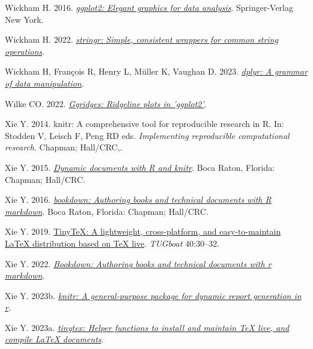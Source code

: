 \documentclass[10pt,a4paper]{article}
\newlength{\cslhangindent}
\newlength{\cslentryspacingunit} %
\newenvironment{CSLReferences}[2] %
 {%
  \setlength{\parindent}{0pt}
  \ifodd #1
  \let\oldpar\par
  \def\par{\hangindent=\cslhangindent\oldpar}
  \fi
  \setlength{\parskip}{#2\cslentryspacingunit}
 }%
 {}
\begin{document}
\begin{CSLReferences}{1}{0}
\leavevmode{}%
Wickham H. 2016. \emph{\href{https://ggplot2.tidyverse.org}{ggplot2: Elegant graphics for data analysis}}. Springer-Verlag New York.

\leavevmode{}%
Wickham H. 2022. \emph{\href{https://CRAN.R-project.org/package=stringr}{{stringr}: Simple, consistent wrappers for common string operations}}.

\leavevmode{}%
Wickham H, François R, Henry L, Müller K, Vaughan D. 2023. \emph{\href{https://CRAN.R-project.org/package=dplyr}{{dplyr}: A grammar of data manipulation}}.

\leavevmode{}%
Wilke CO. 2022. \emph{\href{https://CRAN.R-project.org/package=ggridges}{Ggridges: Ridgeline plots in 'ggplot2'}}.

\leavevmode{}%
Xie Y. 2014. {knitr}: A comprehensive tool for reproducible research in {R}. In: Stodden V, Leisch F, Peng RD eds. \emph{Implementing reproducible computational research}. Chapman; Hall/CRC,.

\leavevmode{}%
Xie Y. 2015. \emph{\href{https://yihui.org/knitr/}{Dynamic documents with {R} and knitr}}. Boca Raton, Florida: Chapman; Hall/CRC.

\leavevmode{}%
Xie Y. 2016. \emph{\href{https://bookdown.org/yihui/bookdown}{{bookdown}: Authoring books and technical documents with {R} markdown}}. Boca Raton, Florida: Chapman; Hall/CRC.

\leavevmode{}%
Xie Y. 2019. \href{https://tug.org/TUGboat/Contents/contents40-1.html}{{TinyTeX}: A lightweight, cross-platform, and easy-to-maintain LaTeX distribution based on TeX live}. \emph{TUGboat} 40:30--32.

\leavevmode{}%
Xie Y. 2022. \emph{\href{https://CRAN.R-project.org/package=bookdown}{Bookdown: Authoring books and technical documents with r markdown}}.

\leavevmode{}%
Xie Y. 2023b. \emph{\href{https://yihui.org/knitr/}{{knitr}: A general-purpose package for dynamic report generation in r}}.

\leavevmode{}%
Xie Y. 2023a. \emph{\href{https://github.com/rstudio/tinytex}{{tinytex}: Helper functions to install and maintain TeX live, and compile LaTeX documents}}.


\end{CSLReferences}
\end{document}
